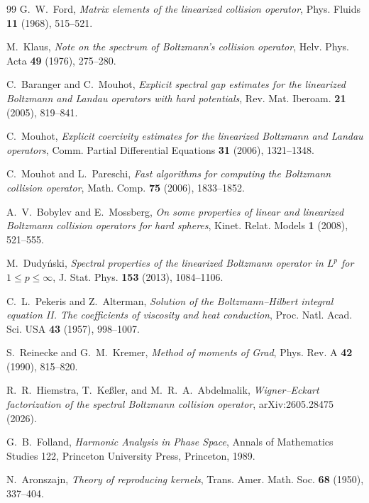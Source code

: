 \documentclass[11pt]{article}
\numberwithin{equation}{section}
\theoremstyle{definition}
\begin{document}
\begin{thebibliography}{99}
G.~W.~Ford,
\emph{Matrix elements of the linearized collision operator},
Phys. Fluids \textbf{11} (1968), 515--521.

M.~Klaus,
\emph{Note on the spectrum of Boltzmann's collision operator},
Helv. Phys. Acta \textbf{49} (1976), 275--280.

C.~Baranger and C.~Mouhot,
\emph{Explicit spectral gap estimates for the linearized Boltzmann and Landau
operators with hard potentials},
Rev. Mat. Iberoam. \textbf{21} (2005), 819--841.

C.~Mouhot,
\emph{Explicit coercivity estimates for the linearized Boltzmann and Landau
operators},
Comm. Partial Differential Equations \textbf{31} (2006), 1321--1348.

C.~Mouhot and L.~Pareschi,
\emph{Fast algorithms for computing the Boltzmann collision operator},
Math. Comp. \textbf{75} (2006), 1833--1852.

A.~V.~Bobylev and E.~Mossberg,
\emph{On some properties of linear and linearized Boltzmann collision
operators for hard spheres},
Kinet. Relat. Models \textbf{1} (2008), 521--555.

M.~Dudy\'nski,
\emph{Spectral properties of the linearized Boltzmann operator in
$L^p$ for $1\le p\le\infty$},
J. Stat. Phys. \textbf{153} (2013), 1084--1106.







C.~L.~Pekeris and Z.~Alterman,
\emph{Solution of the Boltzmann--Hilbert integral equation II. The coefficients
of viscosity and heat conduction},
Proc. Natl. Acad. Sci. USA \textbf{43} (1957), 998--1007.

S.~Reinecke and G.~M.~Kremer,
\emph{Method of moments of Grad},
Phys. Rev. A \textbf{42} (1990), 815--820.

R.~R.~Hiemstra, T.~Ke\ss ler, and M.~R.~A.~Abdelmalik,
\emph{Wigner--Eckart factorization of the spectral Boltzmann collision operator},
arXiv:2605.28475 (2026).

G.~B.~Folland,
\emph{Harmonic Analysis in Phase Space},
Annals of Mathematics Studies 122, Princeton University Press, Princeton, 1989.

N.~Aronszajn,
\emph{Theory of reproducing kernels},
Trans. Amer. Math. Soc. \textbf{68} (1950), 337--404.


\end{thebibliography}
\end{document}
